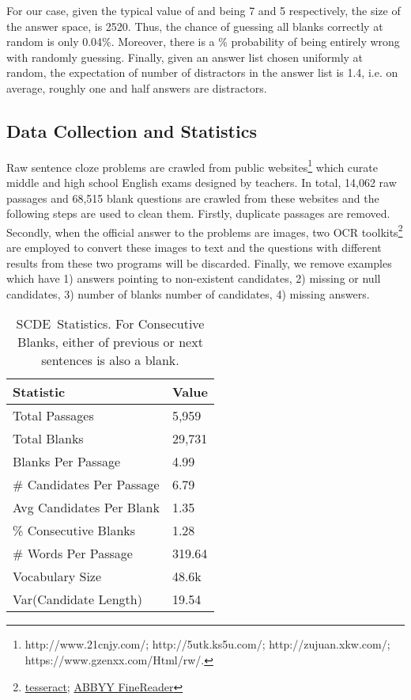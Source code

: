 \documentclass[11pt,a4paper]{article}
\newcommand{\dsname}{\textsc{SCDE}}
\begin{document}
For our case, given the typical value of  and  being 7 and 5 respectively, the size of the answer space,  is 2520.
Thus, the chance of guessing all blanks correctly at random is only 0.04\%. Moreover, there is a \% probability of being entirely wrong with randomly guessing. Finally, given an answer list chosen uniformly at random, the expectation of number of distractors in the answer list is 1.4, i.e. on average, roughly one and half answers are distractors.

\subsection{Data Collection and Statistics} \label{sec:dataCollection}
Raw sentence cloze problems are crawled from public websites\footnote{http://www.21cnjy.com/;
http://5utk.ks5u.com/; http://zujuan.xkw.com/;
https://www.gzenxx.com/Html/rw/.} which curate middle and high school English exams designed by teachers. In total, 14,062 raw passages and 68,515 blank questions are crawled from these websites and the following steps are used to clean them. Firstly, duplicate passages are removed. Secondly, when the official answer to the problems are images, two OCR toolkits\footnote{\href{https://github.com/tesseract-ocr}{tesseract}; \href{https://www.abbyy.com/en-us/finereader/}{ABBYY FineReader}
} are employed to convert these images to text and the questions with different results from these two programs will be discarded. Finally, we remove examples which have 1) answers pointing to non-existent candidates, 2) missing or null candidates, 3) number of blanks  number of candidates, 4) missing answers.


\begin{table}
    \centering
    \begin{tabular}{l l}
    \toprule
    \textbf{Statistic} & \textbf{Value}    \\ \midrule
    Total Passages & 5,959   \\
    Total Blanks & 29,731 \\
    Blanks Per Passage  & 4.99     \\ 
    \# Candidates Per Passage & 6.79  \\
    Avg Candidates Per Blank  & 1.35      \\ 
    \% Consecutive Blanks & 1.28  \\
    \# Words Per Passage & 319.64  \\
    Vocabulary Size & 48.6k\\
    {\rm Var}(Candidate Length)& 19.54 \\
    \bottomrule
    \end{tabular}
    \caption{\dsname~Statistics. For Consecutive Blanks, either of previous or next sentences is also a blank.}
    \textbf{\label{table:stats}}
    \vspace{-4ex}
\end{table} 
\end{document}
